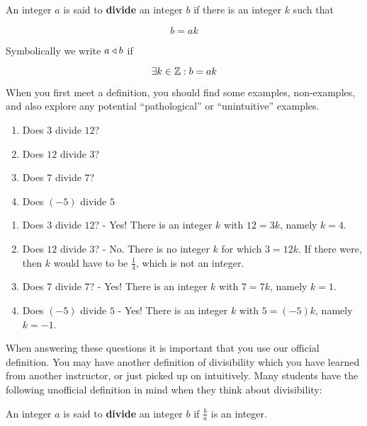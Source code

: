 \begin{definition}
	An integer $a$ is said to \textbf{divide} an integer $b$ if there is an integer $k$ such that
	
	$$
	b = ak
	$$
	
	Symbolically we write  $a \triangleleft b$ if 
	
	$$
	\exists k \in \mathbb{Z}: b=ak
	$$
\end{definition}

When you first meet a definition, you should find some examples, non-examples, and also explore any potential ``pathological'' or ``unintuitive'' examples.  

\begin{xca}
	\begin{enumerate}
	\item Does $3$ divide $12$? 
	\item Does $12$ divide $3$?  
	\item Does $7$ divide $7$? 
	\item Does $(-5)$ divide  $5$  
	\end{enumerate}
\end{xca}

\begin{solutions}
			\begin{enumerate}
			\item Does $3$ divide $12$?  - Yes!  There is an integer $k$ with $12 = 3k$, namely $k=4$. 
			\item Does $12$ divide $3$?  - No.  There is no integer $k$ for which $3 = 12k$.  If there were, then $k$ would have to be $\frac{1}{4}$, which is not an integer.
			\item Does $7$ divide $7$?  - Yes!  There is an integer $k$ with $7 = 7k$, namely $k=1$. 
			\item Does $(-5)$ divide  $5$  - Yes!  There is an integer $k$ with $5 = (-5)k$, namely $k=-1$.
		\end{enumerate}
	\end{solutions}

When answering these questions it is important that you use our official definition.  You may have another definition of divisibility which you have learned from another instructor, or just picked up on intuitively.  Many students have the following unofficial definition in mind when they think about divisibility:

\medskip

\begin{definition}
	An integer $a$ is said to \textbf{divide} an integer $b$ if $\frac{b}{a}$ is an integer.
\end{definition} 

